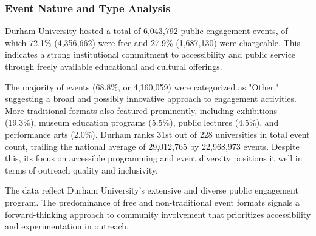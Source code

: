 \documentclass[journal,onecolumn, 10pt,draftclsnofoot]{IEEEtran}
\begin{document}
\subsubsection{Event Nature and Type Analysis}

Durham University hosted a total of 6,043,792 public engagement events, of which 72.1\% (4,356,662) were free and 27.9\% (1,687,130) were chargeable. This indicates a strong institutional commitment to accessibility and public service through freely available educational and cultural offerings.

The majority of events (68.8\%, or 4,160,059) were categorized as "Other," suggesting a broad and possibly innovative approach to engagement activities. More traditional formats also featured prominently, including exhibitions (19.3\%), museum education programs (5.5\%), public lectures (4.5\%), and performance arts (2.0\%). Durham ranks 31st out of 228 universities in total event count, trailing the national average of 29,012,765 by 22,968,973 events. Despite this, its focus on accessible programming and event diversity positions it well in terms of outreach quality and inclusivity.

The data reflect Durham University's extensive and diverse public engagement program. The predominance of free and non-traditional event formats signals a forward-thinking approach to community involvement that prioritizes accessibility and experimentation in outreach.
\end{document}

